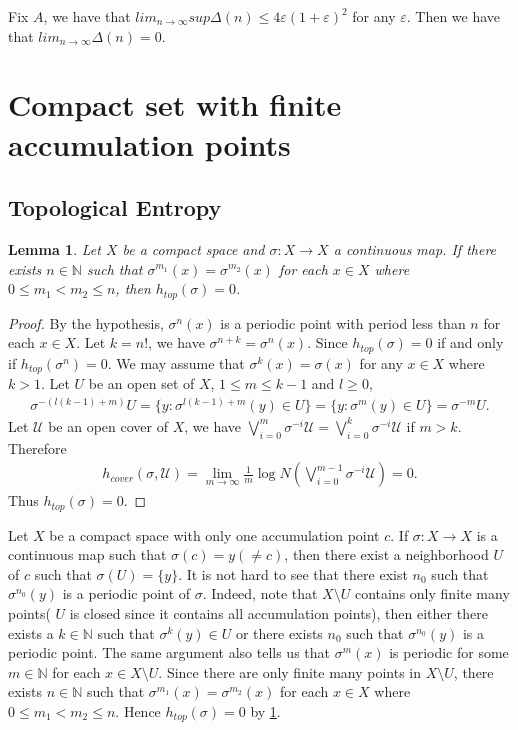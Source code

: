 \documentclass[a4paper,10pt]{amsart}
\newtheorem{lemma}{Lemma}[section]
\newcommand{\UUU}{\mathcal U}
\newcommand{\N}{\mathbb N} %
\begin{document}
Fix $A$, we have that $lim_{n \rightarrow \infty} 
sup \Delta(n) \leq 4\varepsilon(1+\varepsilon)^2$ for any $\varepsilon$.
Then we have that $lim_{n \rightarrow \infty}\Delta(n) = 0$.  

\section{Compact set with finite accumulation points}

\subsection{Topological Entropy}

\begin{lemma} \label{hflem1}
Let $X$ be a compact space and $\sigma: X \rightarrow X$ a
continuous map. If there exists $n \in \N$ such that 
$\sigma^{m_1}(x) = \sigma^{m_2}(x)$ for each $x \in X$
where $0 \leq m_{1} < m_{2} \leq n$, 
then $h_{top}(\sigma) = 0$.
\end{lemma}

\begin{proof}
    By the hypothesis, $\sigma^{n}(x)$ is a periodic point with period
    less than $n$ for each $x \in X$. Let $k = n!$, we have 
    $\sigma^{n+k}=\sigma^{n}(x)$. Since $h_{top}(\sigma) = 0$ if and only
    if $h_{top}(\sigma^{n}) = 0$. We may assume that 
    $\sigma^{k}(x) = \sigma(x)$ for any $x \in X$ where $k > 1$. 
    Let $U$ be an open set of $X$, $1 \leq m \leq k-1$ and $l \geq 0$,
    \begin{align*}
        \sigma^{-(l(k-1) + m)}U = \{y :\sigma^{l(k-1) + m}(y) \in U \}
                               = \{y : \sigma^{m}(y) \in U \} = 
                              \sigma^{-m}U.
    \end{align*}
Let $\UUU$ be an open cover of $X$, we have
$\bigvee^{m}_{i = 0} \sigma^{-i}\UUU = \bigvee^{k}_{i=0} \sigma^{-i}\UUU$
if $m > k$.
Therefore
\begin{align*}
    h_{cover}(\sigma, \UUU) = \lim_{m \rightarrow \infty}
    \frac{1}{m}\log N(\bigvee^{m-1}_{i = 0} \sigma^{-i}\UUU) = 0.
\end{align*}
Thus $h_{top}(\sigma) = 0$.
\end{proof}

Let $X$ be a compact space with only one accumulation point
$c$. If $\sigma : X \rightarrow X$ is a continuous map such that
$\sigma(c) = y(\neq c)$, then there exist a neighborhood $U$ of $c$ such
that $\sigma(U) = \{y \}$. It is not hard to see that there exist $n_0$ such
that $\sigma^{n_0}(y)$ is a periodic point of $\sigma$. Indeed,
note that $X \setminus U$ contains only finite many points(
$U$ is closed since it contains all accumulation points), then either
there exists a $k \in \N$ such that $\sigma^{k}(y) \in U$ or there exists
$n_0$ such that $\sigma^{n_0}(y)$ is a periodic point. The same argument
also tells us that $\sigma^{m}(x)$ is periodic for some $m \in \N$ for each
$x \in X \setminus U$. Since there are only finite many points in 
$X \setminus U$, there exists $n \in \N$ such that 
$\sigma^{m_1}(x) = \sigma^{m_2}(x)$ for each $x \in X$
where $0 \leq m_{1} < m_{2} \leq n$.
Hence $h_{top}(\sigma) = 0$ by \cref{hflem1}.
\end{document}
